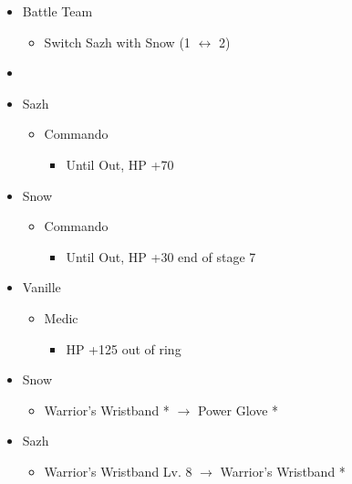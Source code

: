 \documentclass{report}
\begin{document}
\begin{menu}
\begin{itemize}
    \paradigm
    \begin{itemize}
        \item Battle Team
        \begin{itemize}
            \item Switch Sazh with Snow (1 $\leftrightarrow$ 2)
        \end{itemize}
        \item {}%
{\paradigmline{(\rav)}{\com}{\com}}%
{\paradigmline{\textit{\com}}{\textit{(\com)}}{\textit{(\com)}}}%
{\paradigmline{(\rav)}{\sen}{(\rav)}}%
{\paradigmline{(\com)}{(\sen)}{\med}}%
{\paradigmline{\rav}{(\com)}{(\rav)}}%
{\paradigmline{\rav}{\rav}{\rav}}
    \end{itemize}
    \crystarium
    \begin{itemize}
        \item Sazh
        \begin{itemize}
            \item Commando
            \begin{itemize}
                \item Until Out, HP +70
            \end{itemize}
        \end{itemize}
        \item Snow
        \begin{itemize}
            \item Commando
            \begin{itemize}
                \item Until Out, HP +30 end of stage 7
            \end{itemize}
        \end{itemize}
        \item Vanille
        \begin{itemize}
            \item Medic
            \begin{itemize}
                \item HP +125 out of ring
            \end{itemize}
        \end{itemize}
    \end{itemize}
    \equip
    \begin{itemize}
        \item Snow
        \begin{itemize}
            \item Warrior's Wristband * $\rightarrow$ Power Glove *
        \end{itemize}
        \item Sazh
        \begin{itemize}
            \item Warrior's Wristband Lv. 8 $\rightarrow$ Warrior's Wristband *
        \end{itemize}
    \end{itemize}
\end{itemize}
\end{menu}
\end{document}
